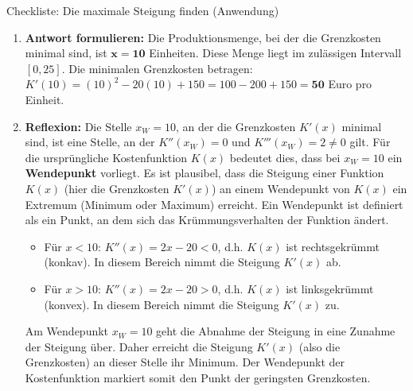 \begin{loesungsumgebung}{Checkliste: Die maximale Steigung finden (Anwendung)}
\begin{enumerate}[label=(\alph*)]
    \item \textbf{Antwort formulieren:}
    Die Produktionsmenge, bei der die Grenzkosten minimal sind, ist $\mathbf{x = 10}$ Einheiten. Diese Menge liegt im zulässigen Intervall $[0, 25]$.
    Die minimalen Grenzkosten betragen:
    $K'(10) = (10)^2 - 20(10) + 150 = 100 - 200 + 150 = \mathbf{50}$ Euro pro Einheit.

    \item \textbf{Reflexion:}
    Die Stelle $x_W=10$, an der die Grenzkosten $K'(x)$ minimal sind, ist eine Stelle, an der $K''(x_W)=0$ und $K'''(x_W) = 2 \neq 0$ gilt. Für die ursprüngliche Kostenfunktion $K(x)$ bedeutet dies, dass bei $x_W=10$ ein \textbf{Wendepunkt} vorliegt.
    Es ist plausibel, dass die Steigung einer Funktion $K(x)$ (hier die Grenzkosten $K'(x)$) an einem Wendepunkt von $K(x)$ ein Extremum (Minimum oder Maximum) erreicht. Ein Wendepunkt ist definiert als ein Punkt, an dem sich das Krümmungsverhalten der Funktion ändert.
    \begin{itemize}
        \item Für $x < 10$: $K''(x) = 2x-20 < 0$, d.h. $K(x)$ ist rechtsgekrümmt (konkav). In diesem Bereich nimmt die Steigung $K'(x)$ ab.
        \item Für $x > 10$: $K''(x) = 2x-20 > 0$, d.h. $K(x)$ ist linksgekrümmt (konvex). In diesem Bereich nimmt die Steigung $K'(x)$ zu.
    \end{itemize}
    Am Wendepunkt $x_W=10$ geht die Abnahme der Steigung in eine Zunahme der Steigung über. Daher erreicht die Steigung $K'(x)$ (also die Grenzkosten) an dieser Stelle ihr Minimum. Der Wendepunkt der Kostenfunktion markiert somit den Punkt der geringsten Grenzkosten.
\end{enumerate}

\end{loesungsumgebung}